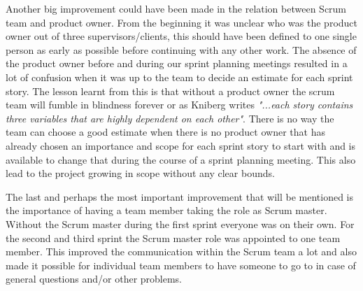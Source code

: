 Another big improvement could have been made in the relation between Scrum team and product owner.
From the beginning it was unclear who was the product owner out of three supervisors/clients, this should have been defined to one single person as early as possible before continuing with any other work.
The absence of the product owner before and during our sprint planning meetings resulted in a lot of confusion when it was up to the team to decide an estimate for each sprint story.
The lesson learnt from this is that without a product owner the scrum team will fumble in blindness forever or as Kniberg writes \cite[p.~25]{kniberg07} {\em "...each story contains three variables that are highly dependent on each other"}.
There is no way the team can choose a good estimate when there is no product owner that has already chosen an importance and scope for each sprint story to start with and is available to change that during the course of a sprint planning meeting.
This also lead to the project growing in scope without any clear bounds.

The last and perhaps the most important improvement that will be mentioned is the importance of having a team member taking the role as Scrum master.
Without the Scrum master during the first sprint everyone was on their own.
For the second and third sprint the Scrum master role was appointed to one team member.
This improved the communication within the Scrum team a lot and also made it possible for individual team members to have someone to go to in case of general questions and/or other problems.

%
%
